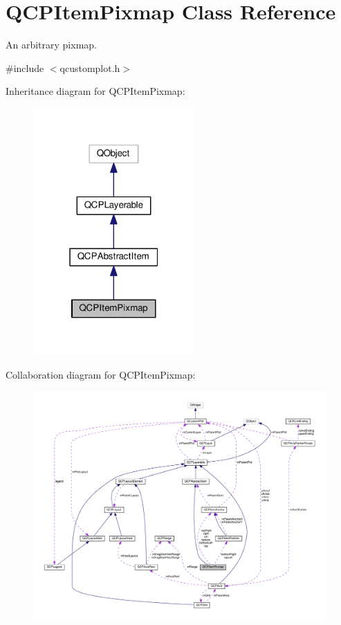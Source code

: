 \hypertarget{classQCPItemPixmap}{}\section{Q\+C\+P\+Item\+Pixmap Class Reference}
\label{classQCPItemPixmap}


An arbitrary pixmap.  




{\ttfamily \#include $<$qcustomplot.\+h$>$}



Inheritance diagram for Q\+C\+P\+Item\+Pixmap\+:\nopagebreak
\begin{figure}[H]
\begin{center}
\leavevmode
\includegraphics[width=175pt]{classQCPItemPixmap__inherit__graph}
\end{center}
\end{figure}


Collaboration diagram for Q\+C\+P\+Item\+Pixmap\+:\nopagebreak
\begin{figure}[H]
\begin{center}
\leavevmode
\includegraphics[width=350pt]{classQCPItemPixmap__coll__graph}
\end{center}
\end{figure}
